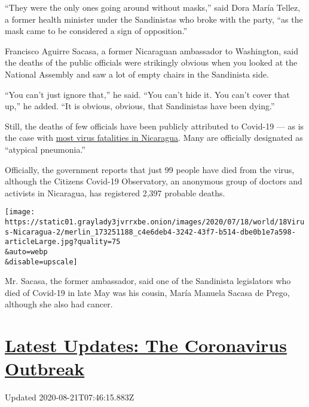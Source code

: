 ``They were the only ones going around without masks,'' said Dora María
Tellez, a former health minister under the Sandinistas who broke with
the party, ``as the mask came to be considered a sign of opposition.''

Francisco Aguirre Sacasa, a former Nicaraguan ambassador to Washington,
said the deaths of the public officials were strikingly obvious when you
looked at the National Assembly and saw a lot of empty chairs in the
Sandinista side.

``You can't just ignore that,'' he said. ``You can't hide it. You can't
cover that up,'' he added. ``It is obvious, obvious, that Sandinistas
have been dying.''

Still, the deaths of few officials have been publicly attributed to
Covid-19 --- as is the case with
\href{https://www.nytimes3xbfgragh.onion/2020/05/31/world/americas/coronavirus-nicaragua-burials.html}{most
virus fatalities in Nicaragua}. Many are officially designated as
``atypical pneumonia.''

Officially, the government reports that just 99 people have died from
the virus, although the Citizens Covid-19 Observatory, an anonymous
group of doctors and activists in Nicaragua, has registered 2,397
probable deaths.

\texttt{[image: https://static01.graylady3jvrrxbe.onion/images/2020/07/18/world/18Virus-Nicaragua-2/merlin\_173251188\_c4e6deb4-3242-43f7-b514-dbe0b1e7a598-articleLarge.jpg?quality=75\\\&auto=webp\\\&disable=upscale]}

Mr. Sacasa, the former ambassador, said one of the Sandinista
legislators who died of Covid-19 in late May was his cousin, María
Manuela Sacasa de Prego, although she also had cancer.

\hypertarget{latest-updates-the-coronavirus-outbreak}{%
\section{\texorpdfstring{\href{https://www.nytimes3xbfgragh.onion/2020/08/20/world/coronavirus-covid.html?action=click\&pgtype=Article\&state=default\&region=MAIN_CONTENT_1\&context=storylines_live_updates}{Latest
Updates: The Coronavirus
Outbreak}}{Latest Updates: The Coronavirus Outbreak}}\label{latest-updates-the-coronavirus-outbreak}}

Updated 2020-08-21T07:46:15.883Z

